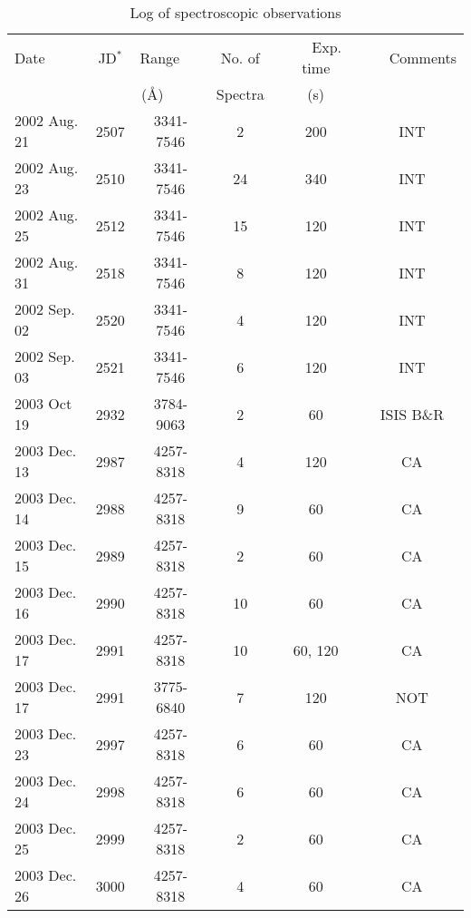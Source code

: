\documentclass[fleqn,usenatbib]{mnras}
\begin{document}
\begin{table}
  \setlength{\tabcolsep}{0.1em}

    \caption{Log of  spectroscopic observations}
    \label{tab:speclog}
    \begin{tabular}{lccccc}
       \hline \hline
      
Date   & JD$^*$ & Range~~~   & No. of   & ~~~Exp. time & ~~~Comments \\
      &         & (\AA)~~~~~ & Spectra  & (s)          &             \\ \hline
2002 Aug. 21 & 2507     &    3341-7546    &            2  & 200  &  INT       \\
2002 Aug. 23 & 2510    &    3341-7546    &            24 & 340  &  INT       \\
2002 Aug. 25 & 2512    &    3341-7546    &  15 & 120  &  INT       \\
2002 Aug. 31 & 2518    &    3341-7546    &            8 & 120  &  INT       \\
2002 Sep. 02 & 2520    &    3341-7546    &            4 & 120  &  INT       \\
2002 Sep. 03 & 2521    &    3341-7546    &            6 & 120  &  INT       \\
2003 Oct 19  & 2932         &  3784-9063      &             2  &   60   & ISIS B\&R  \\
2003 Dec. 13   & 2987    &    4257-8318    &             4 &   120   &  CA         \\
2003 Dec. 14   & 2988    &    4257-8318    &             9 &   60   &  CA         \\
2003 Dec. 15   & 2989    &    4257-8318    &             2 &   60   &  CA         \\
2003 Dec. 16   & 2990    &    4257-8318    &             10 &   60   &  CA         \\
2003 Dec. 17   & 2991    &    4257-8318    &             10 &   60, 120   &  CA         \\
2003 Dec. 17   & 2991    &    3775-6840    &             7 &   120   &  NOT         \\
2003 Dec. 23   & 2997    &    4257-8318    &             6 &   60   &  CA         \\
2003 Dec. 24   & 2998    &    4257-8318    &             6 &   60   &  CA         \\
2003 Dec. 25   & 2999    &    4257-8318    &             2 &   60   &  CA         \\
2003 Dec. 26   & 3000    &    4257-8318    &             4 &   60   &  CA         \\

\end{tabular}
\end{table}
\end{document}

